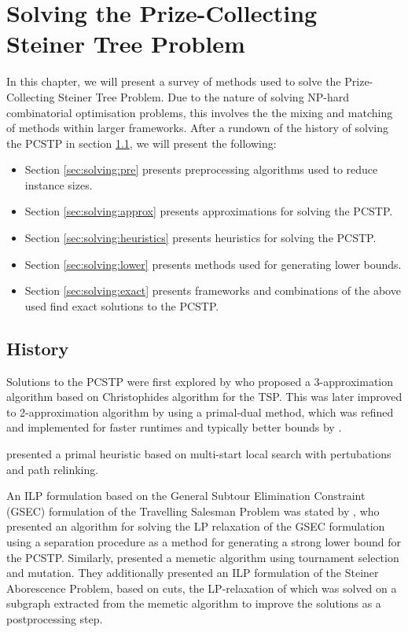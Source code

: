 \chapter{Solving the Prize-Collecting Steiner Tree Problem}
\label{chap:solving}

In this chapter, we will present a survey of methods used to solve the Prize-Collecting Steiner Tree Problem. Due to the nature of solving
NP-hard combinatorial optimisation problems, this involves the the mixing and matching of methods within larger frameworks.
 After a rundown of the history of solving the PCSTP in section \ref{sec:solving:history}, we will present the following:
\begin{itemize}
\item Section \ref{sec:solving:pre} presents preprocessing algorithms used to reduce instance sizes.
\item Section \ref{sec:solving:approx} presents approximations for solving the PCSTP.
\item Section \ref{sec:solving:heuristics} presents heuristics for solving the PCSTP.
\item Section \ref{sec:solving:lower} presents methods used for generating lower bounds.
\item Section \ref{sec:solving:exact} presents frameworks and combinations of the above used find exact solutions
   to the PCSTP.
\end{itemize}

\section{History}
\label{sec:solving:history}

Solutions to the PCSTP were first explored by \citet{Bienstock1993} who
proposed a 3-approximation algorithm based on Christophides algorithm for the TSP.
This was later improved to 2-approximation algorithm by
\citet{goemans1997primal} using a primal-dual method,
which was refined and implemented
for faster runtimes and typically better
bounds by \citet{Johnson:2000:PCS:338219.338637}.

\citet{canuto2001local} presented a primal heuristic based on multi-start
local search with pertubations and path relinking.

An ILP formulation based on the General Subtour Elimination Constraint (GSEC) formulation of the Travelling Salesman Problem was
stated by \citet{lucena2004strong}, who presented an algorithm for solving the LP relaxation of the GSEC formulation using
a separation procedure as a method for generating a strong lower bound for the PCSTP. Similarly, \citet{Ljubic:2004:memetic}
presented a memetic algorithm using tournament selection and mutation. They additionally presented an ILP formulation of the Steiner
 Aborescence Problem, based on cuts, the LP-relaxation of which was solved on a subgraph extracted from the memetic algorithm to
 improve the solutions as a postprocessing step.

